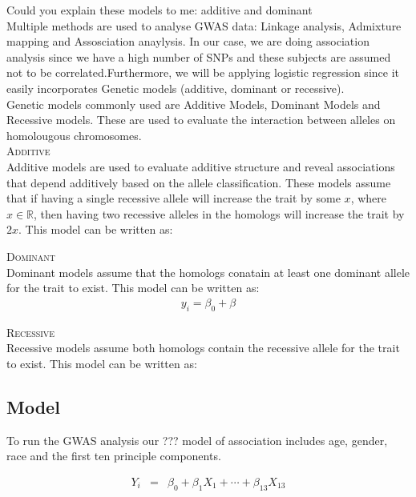 \documentclass[11pt]{article}\usepackage[]{graphicx}\usepackage[]{color}
\begin{document}
Could you explain these models to me: additive and dominant\\

Multiple methods are used to analyse GWAS data: Linkage analysis, Admixture mapping and Assosciation anaylysis. In our case, we are doing association analysis since we have a high number of SNPs and these subjects are assumed not to be correlated.Furthermore, we will be applying logistic regression since it easily incorporates Genetic models (additive, dominant or recessive).\\

Genetic models commonly used are Additive Models, Dominant Models and Recessive models. These are used to evaluate the interaction between alleles on homolougous chromosomes. \\

\textsc{Additive}\\
Additive models are used to evaluate additive structure and reveal associations that depend additively based on the allele classification. These models assume that if having a single recessive allele will increase the trait by some $x$, where $x \in \mathbb{R}$, then having two recessive alleles in the homologs will increase the trait by $2x$. This model can be written as:

\textsc{Dominant}\\
Dominant models assume that the homologs conatain at least one dominant allele for the trait to exist. This model can be written as:
\begin{eqnarray}
y_{i} = \beta_0 + \beta
\end{eqnarray}

\textsc{Recessive}\\
Recessive models assume both homologs contain the recessive allele for the trait to exist. This model can be written as:

\subsection{Model}

To run the GWAS analysis our ??? model of association includes age, gender, race and the first ten principle components.

\begin{eqnarray}
Y_i &=& \beta_0 + \beta_1 X_1 + \cdots + \beta_{13} X_{13} \\

\end{eqnarray}
\end{document}
